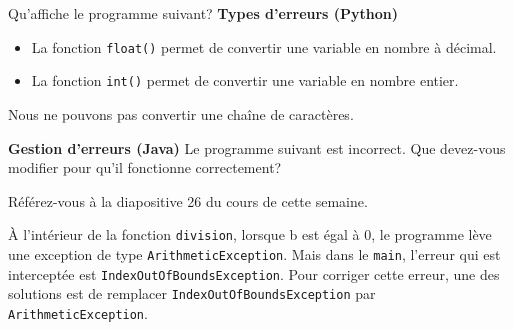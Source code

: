  \begin{Exercice}[5 minutes] Qu'affiche le programme suivant? \textbf{Types d'erreurs (Python)}\\
    
    
     \begin{conseil}
        \begin{itemize}
            \item La fonction \lstinline{float()} permet de convertir une variable en nombre à décimal.
            \item La fonction \lstinline{int()} permet de convertir une variable en nombre entier.
        \end{itemize}  
    \end{conseil}

     \begin{solution}
        Nous ne pouvons pas convertir une chaîne de caractères.
     \end{solution}

\end{Exercice}
 
\begin{Exercice}[5 minutes] \textbf{Gestion d'erreurs (Java)} 
    Le programme suivant est incorrect. Que devez-vous modifier pour qu'il fonctionne correctement?
    \\
    
    

    
     \begin{conseil}
        Référez-vous à la diapositive 26 du cours de cette semaine.           
     \end{conseil}
     \begin{solution}
        À l'intérieur de la fonction \lstinline{division}, lorsque b est égal à 0, le programme lève une exception de type \lstinline{ArithmeticException}. Mais dans le \lstinline{main}, l'erreur qui est interceptée est \lstinline{IndexOutOfBoundsException}. Pour corriger cette erreur, une des solutions est de remplacer \lstinline{IndexOutOfBoundsException} par \lstinline{ArithmeticException}.
     \end{solution}   
 \end{Exercice}


